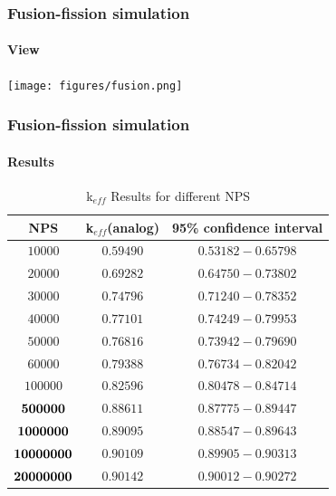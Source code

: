 \documentclass[svgnames,smaller,table,draft]{beamer}
\begin{document}
\begin{frame}
  \frametitle{Fusion-fission simulation}
  \framesubtitle{}

  \framesubtitle{View}
  \begin{center}
    \texttt{[image: figures/fusion.png]}
  \end{center}
\end{frame}



\begin{frame}
  \frametitle{Fusion-fission simulation}
  \framesubtitle{Results}
  

\begin{table}[htb!]
\caption{k$_{eff}$ Results for different NPS}
\label{NPS}
\centering
\vspace{0.5cm}
\begin{tabular}{c|c|c}\hline
NPS & k$_{eff}$(analog) & 95\% confidence interval\\ \hline
$10000$ & $0.59490$ & $0.53182-0.65798$\\ \hline
$20000$ & $0.69282$ & $0.64750-0.73802$\\ \hline
$30000$ & $0.74796$ & $0.71240-0.78352$\\ \hline
$40000$ & $0.77101$ & $0.74249-0.79953$\\ \hline
$50000$ & $0.76816$ & $0.73942-0.79690$\\ \hline
$60000$ & $0.79388$ & $0.76734-0.82042$\\ \hline
$100000$ & $0.82596$ & $0.80478-0.84714$\\ \hline
${\bf 500000}$ & $0.88611$ & $0.87775-0.89447$\\ \hline
${\bf 1000000}$ & $0.89095$ & $0.88547-0.89643$\\ \hline
${\bf 10000000}$ & $0.90109$ & $0.89905-0.90313$\\ \hline
${\bf 20000000}$ & $0.90142$ & $0.90012-0.90272$\\ \hline
\end{tabular}
\end{table}
\end{frame}
\end{document}
